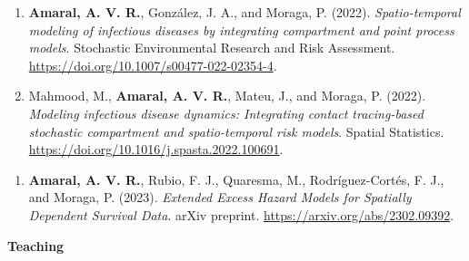 \documentclass[11pt, ]{article}
\begin{document}
	\begin{enumerate}
		\item  \textbf{Amaral, A. V. R.}, González, J. A., and Moraga, P. (2022). \textit{Spatio-temporal modeling of infectious diseases by integrating compartment and point process models}. Stochastic Environmental Research and Risk Assessment. \href{https://doi.org/10.1007/s00477-022-02354-4}{\url{https://doi.org/10.1007/s00477-022-02354-4}}.
		\item  Mahmood, M., \textbf{Amaral, A. V. R.}, Mateu, J., and Moraga, P. (2022). \textit{Modeling infectious disease dynamics: Integrating contact tracing-based stochastic compartment and spatio-temporal risk models}. Spatial Statistics. \href{https://doi.org/10.1016/j.spasta.2022.100691}{\url{https://doi.org/10.1016/j.spasta.2022.100691}}.
	\end{enumerate}

	\vspace{3pt}
	
	\begin{enumerate}
		\item  \textbf{Amaral, A. V. R.}, Rubio, F. J., Quaresma, M., Rodríguez-Cortés, F. J., and Moraga, P. (2023). \textit{Extended Excess Hazard Models for Spatially Dependent Survival Data}. arXiv preprint. \href{https://arxiv.org/abs/2302.09392}{\url{https://arxiv.org/abs/2302.09392}}.
	\end{enumerate}

\vspace{6pt}

{\Large \textbf{Teaching}}
\end{document}
